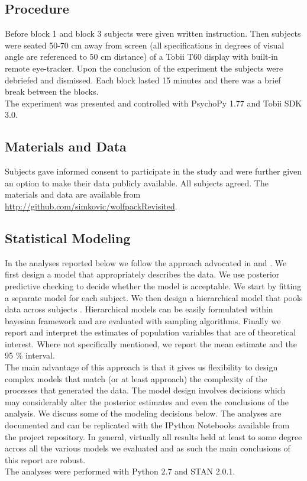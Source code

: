 \documentclass[10pt]{article}
\begin{document}
\subsection*{Procedure}
Before block 1 and block 3 subjects were given written instruction.
Then subjects were seated 50-70 cm away from screen (all specifications in degrees of visual angle are referenced to 50 cm distance) of a Tobii T60 display with built-in remote eye-tracker. 
Upon the conclusion of the experiment the subjects were debriefed and dismissed. 
Each block lasted 15 minutes and there was a brief break between the blocks.\\
The experiment was presented and controlled with PsychoPy 1.77 \cite{peirce07} and Tobii SDK 3.0. 

\subsection*{Materials and Data}
Subjects gave informed consent to participate in the study and were further given an option to make their data publicly available. 
All subjects agreed. 
The materials and data are available from\\ \url{http://github.com/simkovic/wolfpackRevisited}. 

\subsection*{Statistical Modeling}
In the analyses reported below we follow the approach advocated in \cite{gelman07} and \cite{gelman13}. 
We first design a model that appropriately describes the data. 
We use posterior predictive checking to decide whether the model is acceptable. 
We start by fitting a separate model for each subject. 
We then design a hierarchical model that pools data across subjects \cite{lee11a}. 
Hierarchical models can be easily formulated within bayesian framework and are evaluated with sampling algorithms.
Finally we report and interpret the estimates of population variables that are of theoretical interest. Where not specifically mentioned, we report the mean estimate and the 95 \% interval.\\
The main advantage of this approach is that it gives us flexibility to design complex models that match (or at least approach) the complexity of the processes that generated the data.
The model design involves decisions which may considerably alter the posterior estimates and even the conclusions of the analysis.
We discuss some of the modeling decisions below. 
The analyses are documented and can be replicated with the IPython Notebooks available from the project repository.
In general, virtually all results held at least to some degree across all the various models we evaluated and as such the main conclusions of this report are robust.\\
The analyses were performed with Python 2.7 and STAN 2.0.1. 
\end{document}
